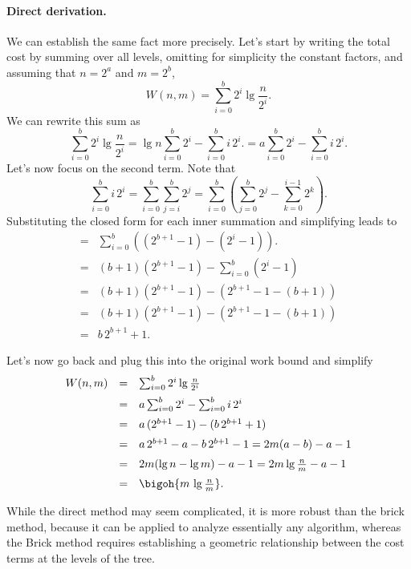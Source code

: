 \begin{chapter}
\paragraph{Direct derivation.}
We can establish the same fact more precisely.  Let's start by writing
the total cost by summing over all levels, omitting for simplicity the
constant factors, and assuming that $n = 2^a$ and $m = 2^b$,
\[
W(n,m) = \sum_{i = 0}^{b}{2^i \lg{\frac{n}{2^i}}}.
\]
We can rewrite this sum as 
\[
\sum_{i = 0}^{b}{2^i \lg{\frac{n}{2^i}}} = 
\lg{n}\sum_{i = 0}^{b}{2^i} - \sum_{i = 0}^{b}{i\,2^i}.
= a\sum_{i = 0}^{b}{2^i} - \sum_{i = 0}^{b}{i\,2^i}.
\]
Let's now focus on the second term. Note that 
\[
\sum_{i = 0}^{b}{i\,2^i} 
=
\sum_{i = 0}^{b}{\sum_{j=i}^{b}2^j} 
=
\sum_{i = 0}^{b}{\left(\sum_{j=0}^{b}{2^j} - \sum_{k=0}^{i-1}2^k\right). }
\]
Substituting the closed form for each inner summation and simplifying
leads to
\[
\begin{array}{ll}
= & \sum_{i = 0}^{b}{\left( (2^{b+1}-1) - (2^{i}-1) \right)}.
\\[2mm]
= &  (b+1) (2^{b+1}-1) - \sum_{i = 0}^{b}{(2^{i}-1)}
\\[2mm]
= &  (b+1) (2^{b+1}-1) - \left( 2^{b+1}-1 - (b+1) \right)
\\[2mm]
= &  (b+1) (2^{b+1}-1) - \left( 2^{b+1}-1 - (b+1) \right)
\\[2mm]
= &  b\,2^{b+1} + 1.
\end{array}
\]

Let's now go back and plug this into the original work bound and simplify
\[
\begin{array}{lll}
W(n,m) & = &\sum_{i = 0}^{b}{2^i \lg{\frac{n}{2^i}}}
\\[2mm]
& = & a\sum_{i = 0}^{b}{2^i} - \sum_{i = 0}^{b}{i\,2^i}
\\[2mm]
& = & a\,(2^{b+1}-1) -  (b\,2^{b+1} + 1)
\\[2mm]
& = & a\,2^{b+1}-a - b\,2^{b+1} -1
= 2m (a-b) - a -1
\\[2mm]
& = & 2m (\lg{n}-\lg{m}) - a -1
= 2m \lg{\frac{n}{m}} - a -1
\\[2mm]
& = & \bigoh{m \, \lg{\frac{n}{m}}}.
\end{array}
\]

While the direct method may seem complicated, it is more robust than
the brick method, because it can be applied to analyze essentially any
algorithm, whereas the Brick method requires establishing a geometric
relationship between the cost terms at the levels of the tree.
%


\end{chapter}
